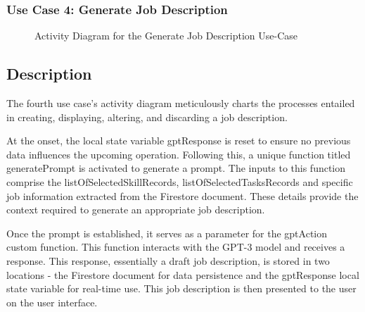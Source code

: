 \subsubsection{Use Case 4: Generate Job Description} 
\begin{figure}[H]
    \centering
    \caption{ Activity Diagram for the Generate Job Description Use-Case }
    \label{fig:UseCase4Sprint2_Activity_Diagram}
\end{figure}

\newpage
\subsection*{Description}
The fourth use case's activity diagram meticulously charts the processes entailed in creating, displaying, altering, and discarding a job description.

At the onset, the local state variable gptResponse is reset to ensure no previous data influences the upcoming operation. Following this, a unique function titled generatePrompt is activated to generate a prompt. The inputs to this function comprise the listOfSelectedSkillRecords, listOfSelectedTasksRecords and specific job information extracted from the Firestore document. These details provide the context required to generate an appropriate job description.

Once the prompt is established, it serves as a parameter for the gptAction custom function. This function interacts with the GPT-3 model and receives a response. This response, essentially a draft job description, is stored in two locations - the Firestore document for data persistence and the gptResponse local state variable for real-time use. This job description is then presented to the user on the user interface.

